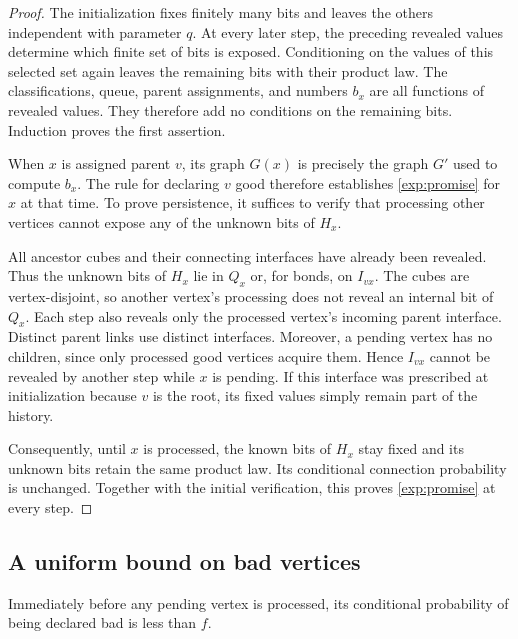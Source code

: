 \begin{proof}
The initialization fixes finitely many bits and leaves the others
independent with parameter $q$. At every later step, the preceding
revealed values determine which finite set of bits is exposed.
Conditioning on the values of this selected set again leaves the
remaining bits with their product law. The classifications, queue,
parent assignments, and numbers $b_x$ are all functions of revealed
values. They therefore add no conditions on the remaining bits.
Induction proves the first assertion.

When $x$ is assigned parent $v$, its graph $G(x)$ is precisely the
graph $G'$ used to compute $b_x$. The rule for declaring $v$ good
therefore establishes \eqref{exp:promise} for $x$ at that time.
To prove persistence, it suffices to verify that processing other
vertices cannot expose any of the unknown bits of $H_x$.

All ancestor cubes and their connecting interfaces have already
been revealed. Thus the unknown bits of $H_x$ lie in $Q_x$ or,
for bonds, on $I_{vx}$. The cubes are vertex-disjoint, so another
vertex's processing does not reveal an internal bit of $Q_x$.
Each step also reveals only the processed vertex's incoming parent
interface. Distinct parent links use distinct interfaces. Moreover, a pending
vertex has no children, since only processed good vertices acquire them.
Hence $I_{vx}$ cannot be revealed by another step while $x$ is
pending. If this interface was prescribed at initialization because
$v$ is the root, its fixed values simply remain part of the history.

Consequently, until $x$ is processed, the known bits of $H_x$ stay
fixed and its unknown bits retain the same product law. Its
conditional connection probability is unchanged. Together with the
initial verification, this proves \eqref{exp:promise} at every step.
\end{proof}

\subsection{A uniform bound on bad vertices}

\begin{lemma}
\label{exp:conditional-bad}
Immediately before any pending vertex is processed, its conditional
probability of being declared bad is less than $f$.
\end{lemma}

